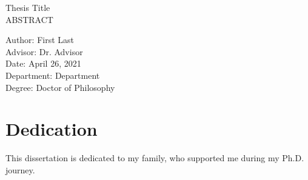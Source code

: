 \documentclass[12pt]{report}
\newcommand{\thesistitle}{Thesis Title}
\newcommand{\thesisname}{First Last}
\newcommand{\thesischairadvisor}{Dr. Advisor}    %
\newcommand{\thesisdepartment}{Department}
\newcommand{\thesisdate}{April 26, 2021}
\newcommand{\thesisdegree}{Doctor of Philosophy}
\begin{document}
\newpage
\doublespacing

\begin{center}
    {\thesistitle}\\ 
    {ABSTRACT}\\
    \vspace{.05in}
\end{center}

\vspace{0.4in}
\begin{flushleft}
Author: \thesisname \\
Advisor: \thesischairadvisor \\
Date: \thesisdate \\
Department: \thesisdepartment \\
Degree: \thesisdegree \\
\end{flushleft}
\newpage

\chapter*{Dedication}
\strut \vspace{2in}
\begin{center}
This dissertation is dedicated to my family, who supported me during my Ph.D. journey.
    \end{center}
    \vfill \strut
    \newpage
\newpage


\newpage

\setcounter{tocdepth}{2} %

\tableofcontents

\newpage

\listoftables
\newpage

\listoffigures{}
\newpage
\end{document}
